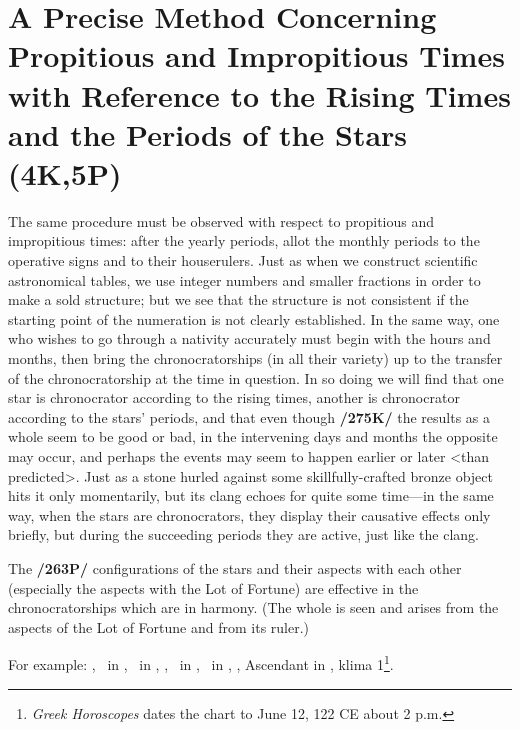 \section{A Precise Method Concerning Propitious and Impropitious Times with Reference to the Rising Times and the Periods of the Stars (4K,5P)}

The same procedure must be observed with respect to propitious and impropitious times: after the yearly periods, allot the monthly periods to the operative signs and to their houserulers. Just as when we construct scientific astronomical tables, we use integer numbers and smaller fractions in order to make a sold structure; but we see that the structure is not consistent if the starting point of the numeration is not
clearly established. In the same way, one who wishes to go through a nativity accurately must begin with the hours and months, then bring the chronocratorships (in all their variety) up to the transfer of the
chronocratorship at the time in question. In so doing we will find that one star is chronocrator according to the rising times, another is chronocrator according to the stars’ periods, and that even though \textbf{/275K/} the results as a whole seem to be good or bad, in the intervening days and months the opposite may occur, and perhaps the events may seem to happen earlier or later <than predicted>. Just as a stone hurled against some skillfully-crafted bronze object hits it only momentarily, but its clang echoes for quite some time—in the same way, when the stars are chronocrators, they display their causative effects only briefly, but during the succeeding periods they are active, just like the clang. 

The \textbf{/263P/} configurations of the stars and their aspects with each other (especially the aspects with the Lot of Fortune) are effective in the chronocratorships which are in harmony. (The whole is seen and arises from the aspects of the Lot of Fortune and from its ruler.)

\newpage
For example: \Sun, \Mercury\, in \Gemini, \Moon\, in \Aquarius, \Saturn, \Venus\, in \Leo, \Jupiter\, in
\Sagittarius, \Mars, Ascendant in \Libra, klima 1\footnote{\textit{Greek Horoscopes} dates the chart to June 12, 122 CE about 2 p.m.}. 

